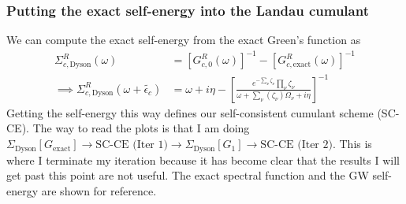 \subsubsection{Putting the exact self-energy into the Landau cumulant}
We can compute the exact self-energy from the exact Green's function as
\begin{align}
    \Sigma^R_{c,\text{Dyson}}(\omega) &= \left[G_{c,0}^R(\omega)\right]^{-1} - \left[G^R_{c,\text{exact}}(\omega)\right]^{-1} \\
\implies \Sigma^R_{c,\text{Dyson}}(\omega+\tilde{\epsilon_c}) &= \omega + i\eta - \left[ \frac{e^{-\sum_\nu \zeta_{\nu}} \prod_\nu \zeta_{\nu}}{\omega+\sum_\nu (\zeta_{\nu}) \Omega_{\nu}+i \eta}\right]^{-1}
\end{align}
Getting the self-energy this way defines our self-consistent cumulant scheme (SC-CE). The way to read the plots is that I am doing $\Sigma_{\text{Dyson}}[G_{\text{exact}}] \rightarrow \text{SC-CE (Iter 1)} \rightarrow \Sigma_{\text{Dyson}}[G_1] \rightarrow \text{SC-CE (Iter 2)}$. This is where I terminate my iteration because it has become clear that the results I will get past this point are not useful. The exact spectral function and the GW self-energy are shown for reference. 
